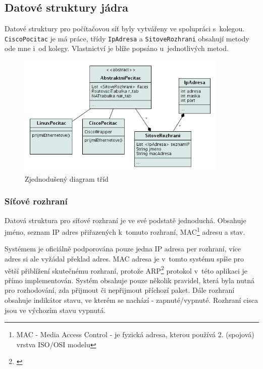 \subsection{Datové struktury jádra}
Datové struktury pro počítačovou síť byly vytvářeny ve spolupráci s~kolegou. \\\verb|CiscoPocitac| je má práce, třídy \verb|IpAdresa| a \verb|SitoveRozhrani| obsahují metody ode mne i~od kolegy. Vlastnictví je blíže popsáno u~jednotlivých metod.

\begin{figure}[h]
\begin{center}
\includegraphics[width=10cm]{figures/uml_class}
\caption{Zjednodušený diagram tříd}
\label{uml:class}
\end{center}
\end{figure}


\subsubsection{Síťové rozhraní}
Datová struktura pro síťové rozhraní je ve své podstatě jednoduchá. Obsahuje jméno, seznam IP adres přiřazených k~tomuto rozhraní, MAC\footnote{MAC - Media Access Control - je fyzická adresa, kterou používá 2. (spojová) vrstva ISO/OSI modelu} adresu a stav.

Systémem je oficiálně podporována pouze jedna IP adresa per rozhraní, více adres si ale vyžádal překlad adres. MAC adresa je v~tomto systému spíše pro větší přiblížení skutečnému rozhraní, protože ARP\footnote{\cite{wiki:arp}} protokol v~této aplikaci je přímo implementován. Systém obsahuje pouze několik pravidel, která byla nutná pro rozhodování, zda přijmout či nepřijmout příchozí paket. Dále rozhraní obsahuje indikátor stavu, ve kterém se nachází - zapnuté/vypnuté. Rozhraní cisca jsou ve výchozím stavu vypnutá.

